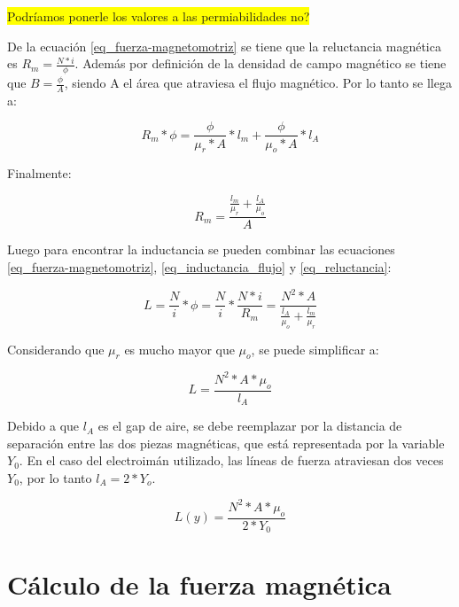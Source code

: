\noindent \colorbox{yellow}{Podríamos ponerle los valores a las permiabilidades no?}

\noindent De la ecuación \ref{eq_fuerza-magnetomotriz} se tiene que la reluctancia magnética es $R_{m}=\frac{N*i}{\phi}$. Además por definición de la densidad de campo magnético se tiene que $B=\frac{\phi}{A}$, siendo A el área que atraviesa el flujo magnético. Por lo tanto se llega a:

\begin{equation}
		R_{m}*\phi=\frac{\phi}{\mu_{r}*A}*l_{m}+\frac{\phi}{\mu_{o}*A}*l_{A}
\end{equation}

\noindent Finalmente:

\begin{equation} \label{eq_reluctancia}
	R_{m}=\frac{\frac{l_{m}}{\mu_{r}}+\frac{l_{A}}{\mu_{o}}}{A}
\end{equation}

\noindent Luego para encontrar la inductancia se pueden combinar las ecuaciones  \ref{eq_fuerza-magnetomotriz}, \ref{eq_inductancia_flujo} y \ref{eq_reluctancia}:

\begin{equation}\label{eq_inductancia_2}
	L=\frac{N}{i}*\phi=\frac{N}{i}*\frac{N*i}{R_{m}}=\frac{N^{2}*A}{\frac{l_{A}}{\mu_{o}}+\frac{l_{m}}{\mu_{r}}}
\end{equation}

\noindent Considerando que $\mu_{r}$ es mucho mayor que $\mu_{o}$, se puede simplificar a:

\begin{equation} \label{eq_inductancia_gap}
	L=\frac{N^{2}*A*\mu_{o}}{l_{A}}
\end{equation}

\noindent \noindent Debido a que $l_{A}$ es el gap de aire, se debe reemplazar por la distancia de separación entre las dos piezas magnéticas, que está representada por la variable $Y_{0}$. En el caso del electroimán utilizado, las líneas de fuerza atraviesan dos veces $Y_{0}$, por lo tanto $l_{A}=2*Y_{o}$.


\begin{equation}\label{eq_inductancia_vs_y}
		L(y)=\frac{{N^{2}*A*\mu_{o}}}{2*Y_{0}}
\end{equation}

\section{Cálculo de la fuerza magnética}

